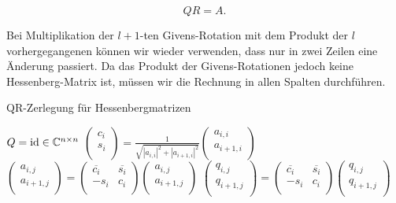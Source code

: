 \documentclass{article}
\theoremstyle{plain}
\begin{document}
$$
QR = A.
$$

Bei Multiplikation der $l+1$-ten Givens-Rotation mit dem Produkt der $l$ vorhergegangenen können wir wieder verwenden, dass nur in zwei Zeilen eine Änderung passiert. Da das Produkt der Givens-Rotationen jedoch keine Hessenberg-Matrix ist, müssen wir die Rechnung in allen Spalten durchführen.


\begin{algorithm}
	\label{QR-Zerlegung_Hessenberg}
	\caption{QR-Zerlegung für Hessenbergmatrizen}
	\begin{algorithmic}[1]
		\State $Q = \operatorname{id} \in \mathbb{C}^{n\times n}$
		\State $\left(\begin{array}{c}
    c_i \\
    s_i \\
\end{array}\right)
=
\frac{1}{\sqrt{|a_{i,i}|^2 + |a_{i+1,i}|^2}}
\left(\begin{array}{c}
a_{i,i} \\
a_{i+1,i} \\
\end{array}\right)$
		\State $\left(\begin{array}{c}
		a_{i,j} \\
		a_{i+1,j}\\
		\end{array}\right)
		=
		\left(\begin{array}{cc}
		\overline{c_i} & \overline{s_i} \\
		-s_i & c_i \\
		\end{array}
		\right)
		\left(\begin{array}{c}
		a_{i,j} \\
		a_{i+1,j}\\
		\end{array}\right)$
		\EndFor
		\State $\left(\begin{array}{c}
		q_{i,j} \\
		q_{i+1,j}\\
		\end{array}\right)
		=
		\left(\begin{array}{cc}
		\overline{c_i} & \overline{s_i} \\
		-s_i & c_i \\
		\end{array}
		\right)
		\left(\begin{array}{c}
		q_{i,j} \\
		q_{i+1,j}\\
		\end{array}\right)$
		\EndFor
		\EndFor
	\end{algorithmic}
\end{algorithm}
\end{document}
